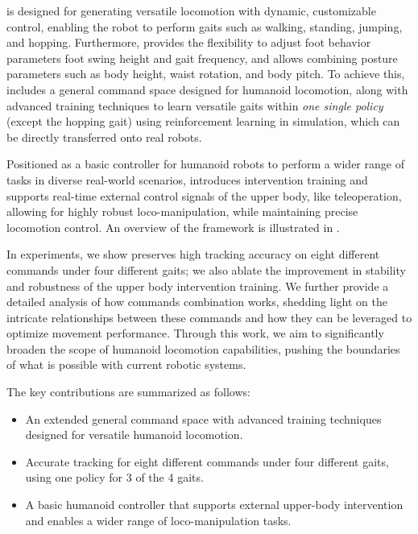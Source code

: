 \our is designed for generating versatile locomotion with dynamic, customizable control, enabling the robot to perform gaits such as walking, standing, jumping, and hopping. Furthermore, \our provides the flexibility to adjust foot behavior parameters 
foot swing height and gait frequency, and allows combining posture parameters such as body height, waist rotation, and body pitch. 
To achieve this, \our includes a general command space designed for humanoid locomotion, along with advanced training techniques to learn versatile gaits within \textit{one single policy} (except the hopping gait) using reinforcement learning in simulation, which can be directly transferred onto real robots.

Positioned as a basic controller for humanoid robots to perform a wider range of tasks in diverse real-world scenarios, \our introduces intervention training and supports real-time external control signals of the upper body, like teleoperation, allowing for highly robust loco-manipulation, while maintaining precise locomotion control. An overview of the framework is illustrated in .

In experiments, we show \our preserves high tracking accuracy on eight different commands under four different gaits; we also ablate the improvement in stability and robustness of the upper body intervention training. We further provide a detailed analysis of how commands combination works, shedding light on the intricate relationships between these commands and how they can be leveraged to optimize movement performance.
Through this work, we aim to significantly broaden the scope of humanoid locomotion capabilities, pushing the boundaries of what is possible with current robotic systems.

The key contributions are summarized as follows:
\begin{itemize}[leftmargin=10pt]
    \item An extended general command space with advanced training techniques designed for versatile humanoid locomotion.
    \item Accurate tracking for eight different commands under four different gaits, using one policy for 3 of the 4 gaits.
    \item A basic humanoid controller that supports external upper-body intervention and enables a wider range of loco-manipulation tasks.
\end{itemize}